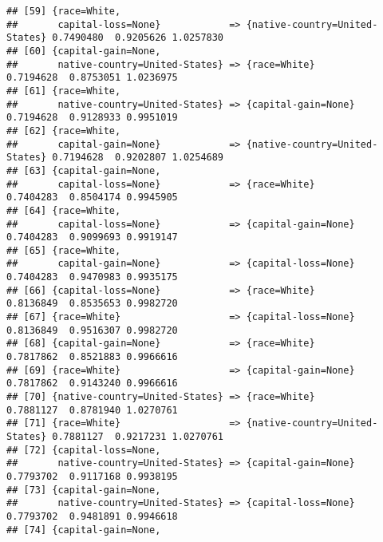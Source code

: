 \documentclass[]{article}
\begin{document}
\begin{verbatim}
## [59] {race=White,                                                                                   
##       capital-loss=None}            => {native-country=United-States} 0.7490480  0.9205626 1.0257830
## [60] {capital-gain=None,                                                                            
##       native-country=United-States} => {race=White}                   0.7194628  0.8753051 1.0236975
## [61] {race=White,                                                                                   
##       native-country=United-States} => {capital-gain=None}            0.7194628  0.9128933 0.9951019
## [62] {race=White,                                                                                   
##       capital-gain=None}            => {native-country=United-States} 0.7194628  0.9202807 1.0254689
## [63] {capital-gain=None,                                                                            
##       capital-loss=None}            => {race=White}                   0.7404283  0.8504174 0.9945905
## [64] {race=White,                                                                                   
##       capital-loss=None}            => {capital-gain=None}            0.7404283  0.9099693 0.9919147
## [65] {race=White,                                                                                   
##       capital-gain=None}            => {capital-loss=None}            0.7404283  0.9470983 0.9935175
## [66] {capital-loss=None}            => {race=White}                   0.8136849  0.8535653 0.9982720
## [67] {race=White}                   => {capital-loss=None}            0.8136849  0.9516307 0.9982720
## [68] {capital-gain=None}            => {race=White}                   0.7817862  0.8521883 0.9966616
## [69] {race=White}                   => {capital-gain=None}            0.7817862  0.9143240 0.9966616
## [70] {native-country=United-States} => {race=White}                   0.7881127  0.8781940 1.0270761
## [71] {race=White}                   => {native-country=United-States} 0.7881127  0.9217231 1.0270761
## [72] {capital-loss=None,                                                                            
##       native-country=United-States} => {capital-gain=None}            0.7793702  0.9117168 0.9938195
## [73] {capital-gain=None,                                                                            
##       native-country=United-States} => {capital-loss=None}            0.7793702  0.9481891 0.9946618
## [74] {capital-gain=None,                                                                            

\end{verbatim}
\end{document}
